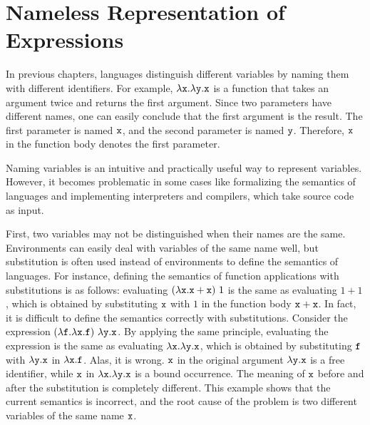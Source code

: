 \setchapterpreamble[u]{\margintoc}
\chapter{Nameless Representation of Expressions}

\renewcommand{\lang}{\textsf{FAE}\xspace}

In previous chapters, languages distinguish different variables by naming them
with different identifiers. For
example, $\lambda \texttt{x}.\lambda \texttt{y}.\texttt{x}$ is a function that takes an
argument twice and returns the first argument. Since two parameters have different
names, one can easily conclude that the first argument is the result. The first
parameter is named $\texttt{x}$, and the second parameter is named $\texttt{y}$. Therefore,
$\texttt{x}$ in the function body denotes the first parameter.

Naming variables is an intuitive and practically useful way to represent
variables. However, it becomes problematic in some cases like formalizing the
semantics of languages and implementing interpreters and compilers, which take
source code as input.

First, two variables may not be distinguished when their names are the same.
Environments can easily deal with variables of the same name well, but
substitution is often used instead of environments to define the semantics of
languages. For instance, defining the semantics of function applications with
substitutions is as follows: evaluating $(\lambda \texttt{x}.\texttt{x} + \texttt{x})\ 1$
is the same as evaluating $1+1$, which is obtained by substituting $\texttt{x}$ with
$1$ in the function body $\texttt{x}+\texttt{x}$.
In fact, it is difficult to define the semantics correctly
with substitutions. Consider the expression $(\lambda \texttt{f}.\lambda \texttt{x}.\texttt{f})\ \lambda \texttt{y}.\texttt{x}$.
By applying the same principle, evaluating
the expression is the same as evaluating $\lambda \texttt{x}.\lambda \texttt{y}.\texttt{x}$,
which is obtained by substituting $\texttt{f}$ with $\lambda \texttt{y}.\texttt{x}$ in
$\lambda \texttt{x}.\texttt{f}$. Alas, it is wrong. $\texttt{x}$ in the original argument
$\lambda \texttt{y}.\texttt{x}$ is a free identifier, while $\texttt{x}$ in $\lambda \texttt{x}.\lambda \texttt{y}.\texttt{x}$
is a bound occurrence. The meaning of $\texttt{x}$
before and after the substitution is completely different. This example shows
that the current semantics is incorrect, and the root cause of the problem is
two different variables of the same name $\texttt{x}$.

